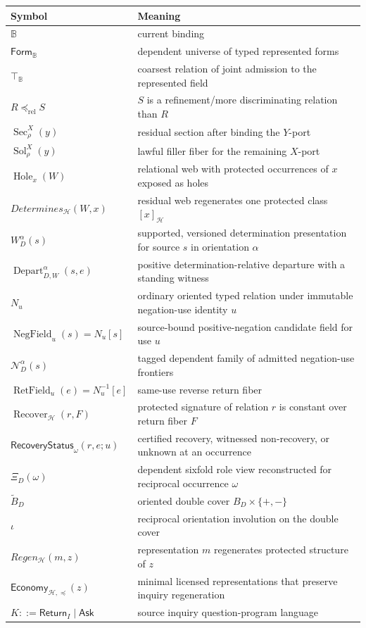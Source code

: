 \documentclass[11pt,oneside]{article}
\newcommand{\B}{\mathbb B}
\newcommand{\Depart}{\operatorname{Depart}}
\newcommand{\NegField}{\operatorname{NegField}}
\newcommand{\RetField}{\operatorname{RetField}}
\newcommand{\Recover}{\operatorname{Recover}}
\begin{document}
\begin{longtable}{p{}p{}}
\toprule
Symbol & Meaning\\
\midrule
\endhead
\(\B\) & current binding\\
\(\mathsf{Form}_{\B}\) & dependent universe of typed represented forms\\
\(\top_{\B}\) & coarsest relation of joint admission to the represented field\\
\(R\preceq_{\mathrm{rel}}S\) & \(S\) is a refinement/more discriminating relation than \(R\)\\
\(\operatorname{Sec}^{X}_{\rho}(y)\) & residual section after binding the \(Y\)-port\\
\(\operatorname{Sol}^{X}_{\rho}(y)\) & lawful filler fiber for the remaining \(X\)-port\\
\(\operatorname{Hole}_x(W)\) & relational web with protected occurrences of \(x\) exposed as holes\\
\(Determines_{\mathcal H}(W,x)\) & residual web regenerates one protected class \([x]_{\mathcal H}\)\\
\(W_D^\alpha(s)\) & supported, versioned determination presentation for source \(s\) in orientation \(\alpha\)\\
\(\Depart_{D,W}^{\alpha}(s,e)\) & positive determination-relative departure with a standing witness\\
\(N_u\) & ordinary oriented typed relation under immutable negation-use identity \(u\)\\
\(\NegField_u(s)=N_u[s]\) & source-bound positive-negation candidate field for use \(u\)\\
\(\mathcal N_D^\alpha(s)\) & tagged dependent family of admitted negation-use frontiers\\
\(\RetField_u(e)=N_u^{-1}[e]\) & same-use reverse return fiber\\
\(\Recover_{\mathcal H}(r,F)\) & protected signature of relation \(r\) is constant over return fiber \(F\)\\
\(\mathsf{RecoveryStatus}_{\omega}(r,e;u)\) & certified recovery, witnessed non-recovery, or unknown at an occurrence\\
\(\Xi_D(\omega)\) & dependent sixfold role view reconstructed for reciprocal occurrence \(\omega\)\\
\(\widetilde B_D\) & oriented double cover \(B_D\times\{+,-\}\)\\
\(\iota\) & reciprocal orientation involution on the double cover\\
\(Regen_{\mathcal H}(m,z)\) & representation \(m\) regenerates protected structure of \(z\)\\
\(\mathsf{Economy}_{\mathcal H,\preceq}(z)\) & minimal licensed representations that preserve inquiry regeneration\\
\(K::=\mathsf{Return}_I\mid\mathsf{Ask}\) & source inquiry question-program language\\


\end{longtable}
\end{document}

